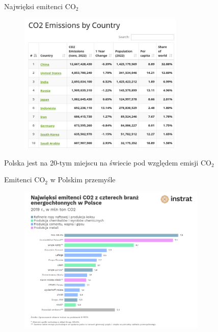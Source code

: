 \begin{frame}{Najwięksi emitenci CO$_2$}
    \begin{figure}
        \includegraphics[width=0.7\textwidth]{images/top_polluters_table.png}
    \end{figure}
    Polska jest na 20-tym miejscu na świecie pod względem emisji CO$_2$
\end{frame}

\begin{frame}{Emitenci CO$_2$ w Polskim przemyśle}
    \begin{figure}
        \includegraphics[width=0.8\textwidth]{images/top_polluters_poland.png}
    \end{figure}
\end{frame}


